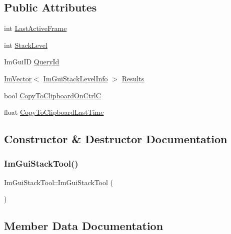 \subsection*{Public Attributes}
\begin{DoxyCompactItemize}
\item 
int \hyperlink{structImGuiStackTool_afd83892a254086474424a160bc6618cc}{Last\+Active\+Frame}
\item 
int \hyperlink{structImGuiStackTool_a5158be15394b997318c425451b42020e}{Stack\+Level}
\item 
Im\+Gui\+ID \hyperlink{structImGuiStackTool_a9f31eee241cb1b59275d86be902e7e39}{Query\+Id}
\item 
\hyperlink{structImVector}{Im\+Vector}$<$ \hyperlink{structImGuiStackLevelInfo}{Im\+Gui\+Stack\+Level\+Info} $>$ \hyperlink{structImGuiStackTool_acf4427708e2b4cbdfe3bfb5820e2e93d}{Results}
\item 
bool \hyperlink{structImGuiStackTool_a82b9d2c30810c5a636874881f976514d}{Copy\+To\+Clipboard\+On\+CtrlC}
\item 
float \hyperlink{structImGuiStackTool_a7063c4ff8e907219611e5ce96ae51d08}{Copy\+To\+Clipboard\+Last\+Time}
\end{DoxyCompactItemize}


\subsection{Constructor \& Destructor Documentation}
\mbox{\label{structImGuiStackTool_a5bcd4f8d4df227eded3dc15e4fdf222c}} 
\subsubsection{\texorpdfstring{Im\+Gui\+Stack\+Tool()}{ImGuiStackTool()}}
{\footnotesize\ttfamily Im\+Gui\+Stack\+Tool\+::\+Im\+Gui\+Stack\+Tool (\begin{DoxyParamCaption}{ }\end{DoxyParamCaption})\hspace{0.3cm}{\ttfamily [inline]}}



\subsection{Member Data Documentation}
\mbox{\label{structImGuiStackTool_a7063c4ff8e907219611e5ce96ae51d08}} 
